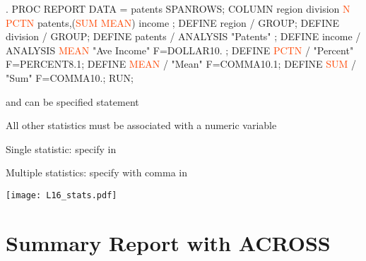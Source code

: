 \begin{frame}[fragile]
\begin{code}{.}
PROC REPORT DATA = patents SPANROWS;
   COLUMN region division \textcolor{OrangeRed}{N PCTN} patents,(\textcolor{OrangeRed}{SUM MEAN}) income ;
   DEFINE region / GROUP;
   DEFINE division / GROUP;
   DEFINE patents / ANALYSIS "Patents" ;
   DEFINE income / ANALYSIS \textcolor{OrangeRed}{MEAN} "Ave Income" F=DOLLAR10. ;
   DEFINE \textcolor{OrangeRed}{PCTN} / "Percent" F=PERCENT8.1;
   DEFINE \textcolor{OrangeRed}{MEAN} / "Mean" F=COMMA10.1;
   DEFINE \textcolor{OrangeRed}{SUM} / "Sum" F=COMMA10.;
RUN;
\end{code}
\emp
\bi
\item {} and  can be specified  statement
\item All other statistics must be associated with a numeric variable
\bi
\item Single statistic: specify in 
\item Multiple statistics: specify with comma in 
\ei
\ei
\end{frame}

\begin{frame}[fragile]
\texttt{[image: L16\_stats.pdf]}
\end{frame}

\section[Summary Report with ACROSS]{Summary Report with ACROSS}
\subsection{}
\begin{frame}
\end{frame}



